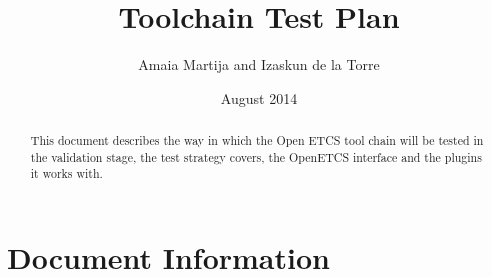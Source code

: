 \documentclass{template/openetcs_report}
\begin{document}
\frontmatter
{}




\title{Toolchain Test Plan}


\date{August 2014}







\author{Amaia Martija and Izaskun de la Torre}






\begin{abstract}
This document describes the way in which the Open ETCS tool chain will be tested in the validation stage, the test strategy covers, the OpenETCS interface and the plugins it works with.  
\end{abstract}


\maketitle
\tableofcontents

\newpage

\chapter{Document Information}
\end{document}
